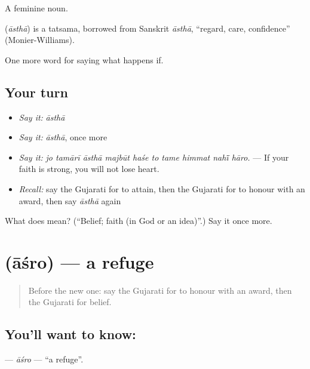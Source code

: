 A feminine noun.

\begin{cousinweb}
\textbf{} (\emph{āsthā}) is a tatsama, borrowed from Sanskrit \emph{āsthā}, \textquotedblleft{}regard, care, confidence\textquotedblright{} (Monier-Williams).
\end{cousinweb}

\begin{grammarlens}[title={What you've built}]
One more word for saying what happens if.
\end{grammarlens}

\subsection*{Your turn}
\begin{itemize}
\raggedright
  \item \emph{Say it:} \emph{āsthā}
  \item \emph{Say it:} \emph{āsthā}, once more
  \item \emph{Say it:} \emph{jo tamārī āsthā majbūt haśe to tame himmat nahī̃ hāro.} — If your faith is strong, you will not lose heart.
  \item \emph{Recall:} say the Gujarati for to attain, then the Gujarati for to honour with an award, then say \emph{āsthā} again
\end{itemize}

\begin{tcolorbox}[breakable,colback=teal!4,colframe=teal!35!black,title={Before you move on}]
What does  mean? (\textquotedblleft{}Belief; faith (in God or an idea)\textquotedblright{}.) Say it once more.
\end{tcolorbox}
\section[\texorpdfstring{\gu{આશરો} (āśro)}{આશરો (āśro)}]{ (āśro) — a refuge}

\label{lesson:GU-C386-asro}



\begin{quote}
Before the new one: say the Gujarati for to honour with an award, then the Gujarati for belief.
\end{quote}

\subsection*{You'll want to know: }
\textbf{} — \emph{āśro} — \textquotedblleft{}a refuge\textquotedblright{}.

